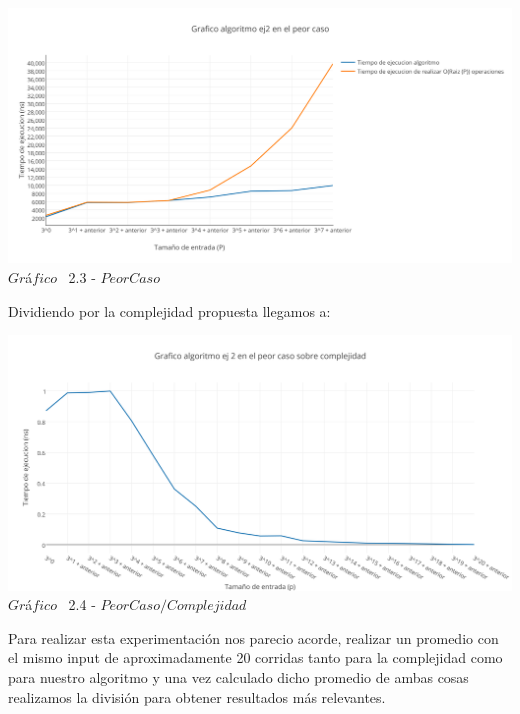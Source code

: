 \vspace*{0.3cm} \vspace*{0.3cm}
  \begin{center}
 \includegraphics[scale=0.65]{./EJ2/peorcaso.png}
 {$Gr$\'a$fico$ \ 2.3 - $Peor Caso$}
  \end{center}
  \vspace*{0.3cm}


Dividiendo por la complejidad propuesta llegamos a:\\

\vspace*{0.3cm} \vspace*{0.3cm}
  \begin{center}
 \includegraphics[scale=0.65]{./EJ2/peorcaso1.png}
 {$Gr$\'a$fico$ \ 2.4 - $Peor Caso / Complejidad$}
  \end{center}
  \vspace*{0.3cm}

Para realizar esta experimentaci\'on nos parecio acorde, realizar un promedio con el mismo input de aproximadamente 20 corridas
tanto para la complejidad como para nuestro algoritmo y una vez calculado dicho promedio de ambas cosas realizamos la divisi\'on para
obtener resultados m\'as relevantes.\\ 

